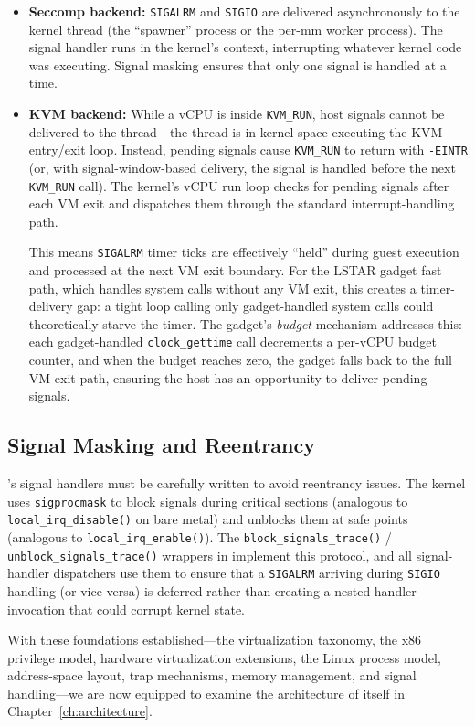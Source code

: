 \begin{itemize}
  \item \textbf{Seccomp backend:}
    \texttt{SIGALRM} and \texttt{SIGIO} are delivered asynchronously
    to the \UML{} kernel thread (the ``spawner'' process or the per-mm
    worker process).  The signal handler runs in the \UML{} kernel's
    context, interrupting whatever kernel code was executing.  Signal
    masking ensures that only one signal is handled at a time.

  \item \textbf{KVM backend:}
    While a vCPU is inside \texttt{KVM\_RUN}, host signals cannot be
    delivered to the thread---the thread is in kernel space executing
    the KVM entry/exit loop.  Instead, pending signals cause
    \texttt{KVM\_RUN} to return with \texttt{-EINTR} (or, with
    signal-window-based delivery, the signal is handled before the
    next \texttt{KVM\_RUN} call).  The \UML{} kernel's vCPU run loop
    checks for pending signals after each VM exit and dispatches
    them through the standard \UML{} interrupt-handling path.

    This means \texttt{SIGALRM} timer ticks are effectively ``held''
    during guest execution and processed at the next VM exit
    boundary.  For the LSTAR gadget fast path, which handles system
    calls without any VM exit, this creates a timer-delivery gap:
    a tight loop calling only gadget-handled system calls could
    theoretically starve the timer.  The gadget's \emph{budget}
    mechanism addresses this: each gadget-handled
    \texttt{clock\_gettime} call decrements a per-vCPU budget counter,
    and when the budget reaches zero, the gadget falls back to the
    full VM exit path, ensuring the host has an opportunity to deliver
    pending signals.
\end{itemize}

\subsection{Signal Masking and Reentrancy}

\UML{}'s signal handlers must be carefully written to avoid reentrancy
issues.  The \UML{} kernel uses \texttt{sigprocmask} to block signals
during critical sections (analogous to \texttt{local\_irq\_disable()}
on bare metal) and unblocks them at safe points (analogous to
\texttt{local\_irq\_enable()}).  The \texttt{block\_signals\_trace()} /
\texttt{unblock\_signals\_trace()} wrappers in
 implement this protocol, and all
signal-handler dispatchers use them to ensure that a \texttt{SIGALRM}
arriving during \texttt{SIGIO} handling (or vice versa) is deferred
rather than creating a nested handler invocation that could corrupt
kernel state.

\bigskip

With these foundations established---the virtualization taxonomy, the
x86 privilege model, hardware virtualization extensions, the Linux
process model, address-space layout, trap mechanisms, memory
management, and signal handling---we are now equipped to examine the
architecture of \UML{} itself in Chapter~\ref{ch:architecture}.
